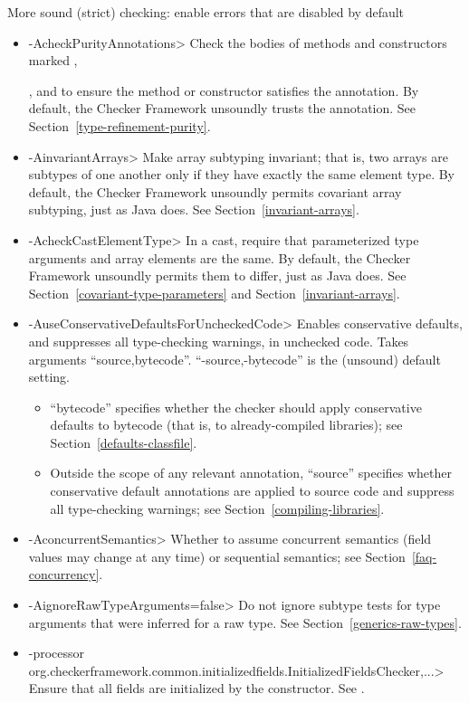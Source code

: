 \label{unsound-by-default}
More sound (strict) checking: enable errors that are disabled by default
\begin{itemize}
\item \<-AcheckPurityAnnotations>
  Check the bodies of methods and constructors marked
  ,

  ,
  and 
  to ensure the method or constructor satisfies the annotation.  By default,
  the Checker Framework unsoundly trusts the annotation.  See
  Section~\ref{type-refinement-purity}.
\item \<-AinvariantArrays>
  Make array subtyping invariant; that is, two arrays are subtypes of one
  another only if they have exactly the same element type.  By default,
  the Checker Framework unsoundly permits covariant array subtyping, just
  as Java does.  See Section~\ref{invariant-arrays}.
\item \<-AcheckCastElementType>
  In a cast, require that parameterized type arguments and array elements
  are the same.  By default, the Checker Framework unsoundly permits them
  to differ, just as Java does.  See Section~\ref{covariant-type-parameters}
  and Section~\ref{invariant-arrays}.
\item \<-AuseConservativeDefaultsForUncheckedCode>
  Enables conservative defaults, and suppresses all type-checking warnings,
  in unchecked code.  Takes arguments ``source,bytecode''.
  ``-source,-bytecode'' is the (unsound) default setting.
  \begin{itemize}
  \item
  ``bytecode'' specifies
  whether the checker should apply conservative defaults to
  bytecode (that is, to already-compiled libraries); see
  Section~\ref{defaults-classfile}.
  \item
  Outside the scope of any relevant
   annotation, ``source'' specifies whether conservative
  default annotations are applied to source code and suppress all type-checking warnings; see
  Section~\ref{compiling-libraries}.
  \end{itemize}
\item \<-AconcurrentSemantics>
  Whether to assume concurrent semantics (field values may change at any
  time) or sequential semantics; see Section~\ref{faq-concurrency}.
\item \<-AignoreRawTypeArguments=false>
  Do not ignore subtype tests for type arguments that were inferred for a
  raw type.  See Section~\ref{generics-raw-types}.
\item \<-processor org.checkerframework.common.initializedfields.InitializedFieldsChecker,...>
  Ensure that all fields are initialized by the constructor.  See
  .
\end{itemize}

